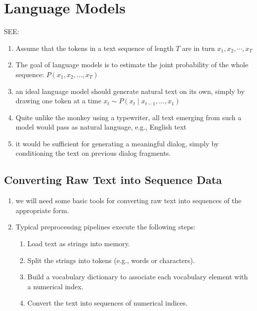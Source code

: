 \section{Language Models \cite{dnn-1}} \label{Language Models}

SEE: 

\begin{enumerate}
    \item Assume that the tokens in a text sequence of length $T$ are in turn $x_1, x_2, \cdots, x_T$

    \item The goal of language models is to estimate the joint probability of the whole sequence: $P(x_1, x_2, \ldots, x_T)$ 

    \item an ideal language model should generate natural text on its own, simply by drawing one token at a time $x_t \sim P(x_t \mid x_{t-1}, \ldots, x_1)$

    \item Quite unlike the monkey using a typewriter, all text emerging from such a model would pass as natural language, e.g., English text

    \item it would be sufficient for generating a meaningful dialog, simply by conditioning the text on previous dialog fragments.

    
\end{enumerate}


\subsection{Converting Raw Text into Sequence Data \cite{dnn-1}}

\begin{enumerate}
    \item we will need some basic tools for converting raw text into sequences of the appropriate form.

    \item Typical preprocessing pipelines execute the following steps:
    \begin{enumerate}
        \item Load text as strings into memory.

        \item Split the strings into tokens (e.g., words or characters).

        \item Build a vocabulary dictionary to associate each vocabulary element with a numerical index.

        \item Convert the text into sequences of numerical indices.

    \end{enumerate}
\end{enumerate}


